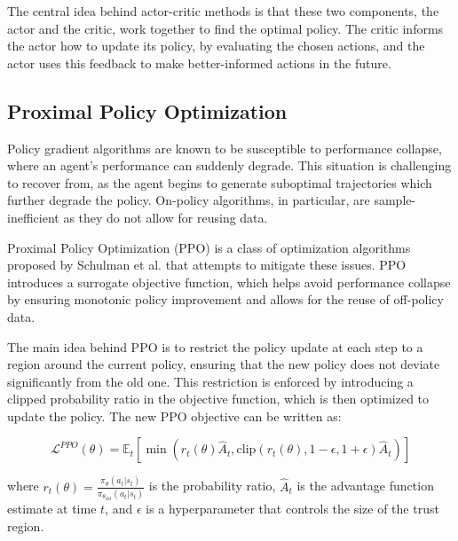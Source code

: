 The central idea behind actor-critic methods is that these two components, the actor and the critic, work together to find the optimal policy. The critic informs the actor how to update its policy, by evaluating the chosen actions, and the actor uses this feedback to make better-informed actions in the future.

\subsection{Proximal Policy Optimization}

Policy gradient algorithms are known to be susceptible to performance collapse, where an agent's performance can suddenly degrade. This situation is challenging to recover from, as the agent begins to generate suboptimal trajectories which further degrade the policy. On-policy algorithms, in particular, are sample-inefficient as they do not allow for reusing data.

Proximal Policy Optimization (PPO) is a class of optimization algorithms proposed by Schulman et al. that attempts to mitigate these issues. PPO introduces a surrogate objective function, which helps avoid performance collapse by ensuring monotonic policy improvement and allows for the reuse of off-policy data.

The main idea behind PPO is to restrict the policy update at each step to a region around the current policy, ensuring that the new policy does not deviate significantly from the old one. This restriction is enforced by introducing a clipped probability ratio in the objective function, which is then optimized to update the policy. The new PPO objective can be written as:

\[
\mathcal{L}^{PPO}(\theta) = \mathbb{E}_{t} \left[ \min \left( r_t(\theta) \hat{A}_t, \text{clip} \left( r_t(\theta), 1 - \epsilon, 1 + \epsilon \right) \hat{A}_t \right) \right]
\]

where $r_t(\theta) = \frac{\pi_{\theta}(a_t|s_t)}{\pi_{\theta_{\text{old}}}(a_t|s_t)}$ is the probability ratio, $\hat{A}_t$ is the advantage function estimate at time $t$, and $\epsilon$ is a hyperparameter that controls the size of the trust region.

